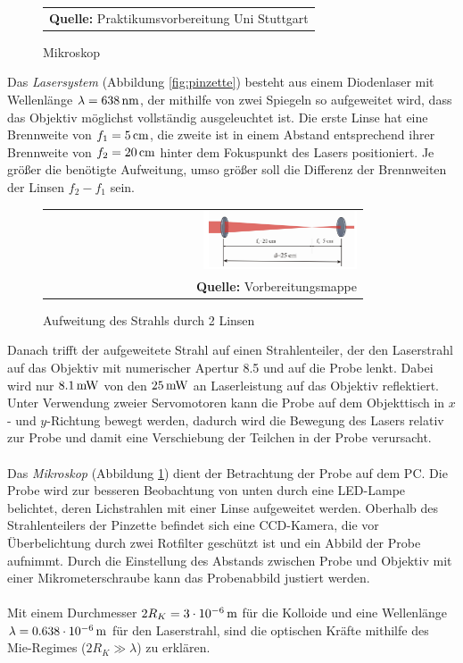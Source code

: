 \documentclass[a4paper,titlepage]{scrartcl}
\numberwithin{equation}{section}
\begin{document}
\begin{figure}[H]
\begin{minipage}{.5\textwidth}
\begin{tabular}{@{}r@{}}
\footnotesize\sffamily\textbf{Quelle:} Praktikumsvorbereitung Uni Stuttgart \cite{praktikum}
\end{tabular}
\caption{Mikroskop}
\label{fig:mikroskop}
\end{minipage}
\end{figure}
Das \emph{Lasersystem} (Abbildung \ref{fig:pinzette}) besteht aus einem Diodenlaser mit Wellenlänge $\lambda=\unit[638]{nm}$, der mithilfe von zwei Spiegeln so aufgeweitet wird, dass das Objektiv möglichst vollständig ausgeleuchtet ist. Die erste Linse hat eine Brennweite von $f_1=\unit[5]{cm}$, die zweite ist in einem Abstand entsprechend ihrer Brennweite von $f_2=\unit[20]{cm}$ hinter dem Fokuspunkt des Lasers positioniert. Je größer die benötigte Aufweitung, umso größer soll die Differenz der Brennweiten der Linsen $f_2-f_1$ sein.
\begin{figure}[H]
	\centering
	\begin{tabular}{@{}r@{}}
		\includegraphics[width=0.5\textwidth]{images/twolenses.PNG}\\
		\footnotesize\sffamily\textbf{Quelle:} Vorbereitungsmappe \cite{vorbereitungsmappe}
	\end{tabular}
	\caption{Aufweitung des Strahls durch 2 Linsen}
    \label{fig:twolenses}
\end{figure}
Danach trifft der aufgeweitete Strahl auf einen Strahlenteiler, der den Laserstrahl auf das Objektiv mit numerischer Apertur 8.5 und auf die Probe lenkt. Dabei wird nur $\unit[8.1]{mW}$ von den $\unit[25]{mW}$ an Laserleistung auf das Objektiv reflektiert. Unter Verwendung zweier Servomotoren kann die Probe auf dem Objekttisch in $x$- und $y$-Richtung bewegt werden, dadurch wird die Bewegung des Lasers relativ zur Probe und damit eine Verschiebung der Teilchen in der Probe verursacht.\\ \\
Das \emph{Mikroskop} (Abbildung \ref{fig:mikroskop}) dient der Betrachtung der Probe auf dem PC. Die Probe wird zur besseren Beobachtung von unten durch eine LED-Lampe belichtet, deren Lichstrahlen mit einer Linse aufgeweitet werden. Oberhalb des Strahlenteilers der Pinzette befindet sich eine CCD-Kamera, die vor Überbelichtung durch zwei Rotfilter geschützt ist und ein Abbild der Probe aufnimmt. Durch die Einstellung des Abstands zwischen Probe und Objektiv mit einer Mikrometerschraube kann das Probenabbild justiert werden.\\ \\
Mit einem Durchmesser $2R_K=\unit[3 \cdot 10^{-6}]{m}$ für die Kolloide und eine Wellenlänge $\lambda=\unit[0.638 \cdot 10^{-6}]{m}$ für den Laserstrahl, sind die optischen Kräfte mithilfe des Mie-Regimes ($2R_K \gg \lambda$) zu erklären.
\end{document}
